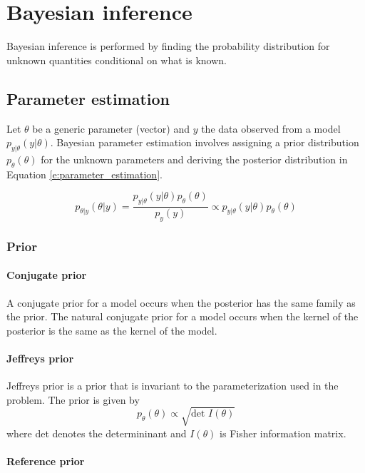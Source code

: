 
\chapter{Bayesian inference}

Bayesian inference is performed by finding the probability distribution for 
unknown quantities conditional on what is known. 

\section{Parameter estimation}

Let $\theta$ be a generic parameter (vector) and $y$ the data observed from 
a model $p_{y|\theta}(y|\theta)$. 
Bayesian parameter estimation involves assigning a prior distribution 
$p_\theta(\theta)$ for the unknown parameters and deriving the posterior 
distribution in Equation \eqref{e:parameter_estimation}.

\begin{equation}
p_{\theta|y}(\theta|y) 
= \frac{p_{y|\theta}(y|\theta)p_\theta(\theta)}{p_y(y)} 
\propto p_{y|\theta}(y|\theta)p_\theta(\theta) 
\label{e:parameter_estimation}
\end{equation}


\subsection{Prior}

\subsubsection{Conjugate prior}

A conjugate prior for a model occurs when the posterior has the same family as 
the prior.
The natural conjugate prior for a model occurs when the kernel of the posterior
is the same as the kernel of the model.

\subsubsection{Jeffreys prior}

Jeffreys prior is a prior that is invariant to the parameterization used in the 
problem. 
The prior is given by 
\[
p_\theta(\theta) \propto \sqrt{\text{det }I(\theta)}
\]
where det denotes the determininant and $I(\theta)$ is Fisher information matrix.

\subsubsection{Reference prior}

